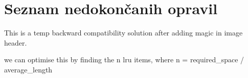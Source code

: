 \chapter{Seznam nedokončanih opravil}
\hypertarget{todo}{}\label{todo}

\begin{DoxyRefList}
\item[Element \doxylink{lv__bin__decoder_8h_a25e1523d88b409c545f1a02945c2c224}{lv\+\_\+bin\+\_\+decoder\+\_\+info} (lv\+\_\+image\+\_\+decoder\+\_\+t \texorpdfstring{$\ast$}{*}decoder, lv\+\_\+image\+\_\+decoder\+\_\+dsc\+\_\+t \texorpdfstring{$\ast$}{*}dsc, \doxylink{structlv__image__header__t}{lv\+\_\+image\+\_\+header\+\_\+t} \texorpdfstring{$\ast$}{*}header)]\label{todo__todo000002}%
%
 This is a temp backward compatibility solution after adding magic in image header.  
\item[Element \doxylink{lv__lru_8h_a9075eea287cbb4c74aefa191dba2f2b3}{lv\+\_\+lru\+\_\+remove\+\_\+lru\+\_\+item} (lv\+\_\+lru\+\_\+t \texorpdfstring{$\ast$}{*}cache)]\label{todo__todo000003}%
%
we can optimise this by finding the n lru items, where n = required\+\_\+space / average\+\_\+length 
\end{DoxyRefList}
